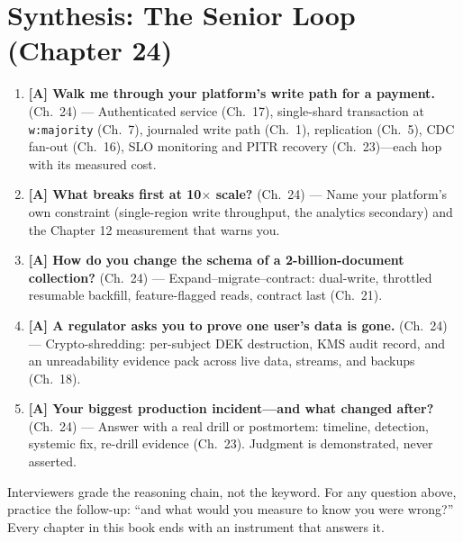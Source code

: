 \section{Synthesis: The Senior Loop (Chapter 24)}
\begin{enumerate}
    \item \textbf{[A] Walk me through your platform's write path for a payment.} (Ch.~24) --- Authenticated service (Ch.~17), single-shard transaction at \texttt{w:majority} (Ch.~7), journaled write path (Ch.~1), replication (Ch.~5), CDC fan-out (Ch.~16), SLO monitoring and PITR recovery (Ch.~23)---each hop with its measured cost.
    \item \textbf{[A] What breaks first at 10$\times$ scale?} (Ch.~24) --- Name your platform's own constraint (single-region write throughput, the analytics secondary) and the Chapter 12 measurement that warns you.
    \item \textbf{[A] How do you change the schema of a 2-billion-document collection?} (Ch.~24) --- Expand--migrate--contract: dual-write, throttled resumable backfill, feature-flagged reads, contract last (Ch.~21).
    \item \textbf{[A] A regulator asks you to prove one user's data is gone.} (Ch.~24) --- Crypto-shredding: per-subject DEK destruction, KMS audit record, and an unreadability evidence pack across live data, streams, and backups (Ch.~18).
    \item \textbf{[A] Your biggest production incident---and what changed after?} (Ch.~24) --- Answer with a real drill or postmortem: timeline, detection, systemic fix, re-drill evidence (Ch.~23). Judgment is demonstrated, never asserted.
\end{enumerate}

\begin{tipbox}
Interviewers grade the reasoning chain, not the keyword. For any question above, practice the
follow-up: ``and what would you measure to know you were wrong?'' Every chapter in this book ends
with an instrument that answers it.
\end{tipbox}
